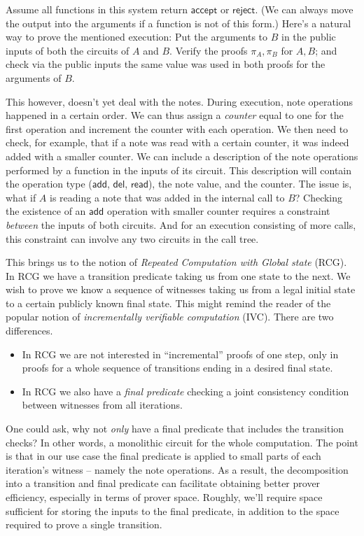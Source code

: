 \documentclass[11pt]{article} %
\newcommand{\Patrick}[1]{\textcolor{blue}{{\bf Patrick}: #1}}
\newcommand{\rej}{\ensuremath{\mathsf{reject}}\xspace}
\newcommand{\accept}{\ensuremath{\mathsf{accept}}\xspace}
\newcommand{\prf}{\ensuremath{\mathsf{\pi}}\xspace}
\newcommand{\add}{\ensuremath{\mathsf{add}}\xspace}
\newcommand{\del}{\ensuremath{\mathsf{del}}\xspace}
\renewcommand{\read}{\ensuremath{\mathsf{read}}\xspace}
\begin{document}
Assume all functions in this system return \accept or \rej. (We can always move the output into the arguments if a function is not of this form.)
Here's a natural way to prove the mentioned execution: Put the arguments to $B$ in the public inputs of both the circuits of $A$ and $B$.
Verify the proofs $\prf_A,\prf_B$ for $A,B$; and check via the public inputs the same value was used in both proofs for the arguments of $B$.

This however, doesn't yet deal with the notes. During execution, note operations happened in a certain order.
We can thus assign a \emph{counter} equal to one for the first operation
and increment the counter with each operation.
We then need to check, for example, that if a note was read with a certain counter, it was indeed added
with a smaller counter.
We can include a description of the note operations performed by a function in the inputs of its circuit. This description will contain the operation type (\add, \del, \read), the note value, and the counter.
The issue is, what if $A$ is reading a note that was added in the internal call to $B$?
Checking the existence of an $\add$ operation with smaller counter requires a constraint \emph{between} the inputs of both circuits. And for an execution consisting of more calls, this constraint can involve any two circuits in the call tree.

This brings us to the notion of \emph{Repeated Computation with Global state} (RCG). In RCG we have a transition predicate taking us from one state to the next. We wish to prove we know a sequence of witnesses taking us from a legal initial state to a certain publicly known final state. This might remind the reader of the popular notion of \emph{incrementally verifiable computation} (IVC). There are two differences.

\begin{itemize}
 \item
In RCG we are not interested in ``incremental'' proofs of one step, only in proofs for a whole
sequence of transitions ending in a desired final state.
\item In RCG we also have a \emph{final predicate} checking a joint consistency condition between witnesses from all iterations.
\end{itemize}
 One could ask, why not \emph{only} have a final predicate that includes the transition checks? In other words, a monolithic circuit for the whole computation.
The point is that in our use case the final predicate is applied to small parts of each iteration's witness -- namely the note operations. As a result, the decomposition into a transition and final predicate can facilitate obtaining better prover efficiency, especially in terms of prover space.
Roughly, we'll require space sufficient for storing the inputs to the final predicate, in addition to the space required to prove a single transition.
\end{document}
